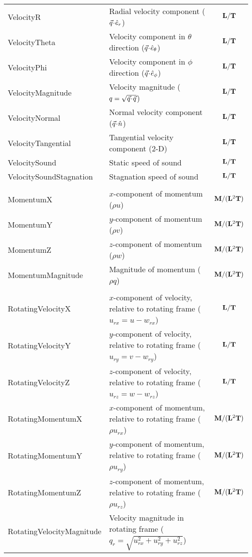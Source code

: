 \begin{longtable}{>{\ttfamily}l >{\raggedright\arraybackslash}p{\Pwidth} c}
VelocityR               & Radial velocity component (${\vec{q}}\!\cdot\!{{\hat{e}}_r}$) &
   ${\bf L}/{\bf T}$ \\
VelocityTheta           & Velocity component in $\theta$ direction (${\vec{q}}\!\cdot\!{{\hat{e}}_\theta}$) &
   ${\bf L}/{\bf T}$ \\
VelocityPhi             & Velocity component in $\phi$ direction (${\vec{q}}\!\cdot\!{{\hat{e}}_\phi}$) &
   ${\bf L}/{\bf T}$ \\
VelocityMagnitude       & Velocity magnitude ($q= \sqrt{ {\vec{q}}\!\cdot\!{\vec{q}} }$) &
   ${\bf L}/{\bf T}$ \\
VelocityNormal          & Normal velocity component (${\vec{q}}\!\cdot\!{\hat{n}}$) &
   ${\bf L}/{\bf T}$ \\
VelocityTangential      & Tangential velocity component (2-D) &
   ${\bf L}/{\bf T}$ \\
VelocitySound           & Static speed of sound &
   ${\bf L}/{\bf T}$ \\      
VelocitySoundStagnation & Stagnation speed of sound &
   ${\bf L}/{\bf T}$ \\
\\
MomentumX               & $x$-component of momentum ($\rho u$) &
   ${\bf M}/({\bf L}^2{\bf T})$ \\
MomentumY               & $y$-component of momentum ($\rho v$) &
   ${\bf M}/({\bf L}^2{\bf T})$ \\
MomentumZ               & $z$-component of momentum ($\rho w$) &
   ${\bf M}/({\bf L}^2{\bf T})$ \\
MomentumMagnitude       & Magnitude of momentum ($\rho q$) &
   ${\bf M}/({\bf L}^2{\bf T})$ \\
\\
RotatingVelocityX       & $x$-component of velocity, relative to rotating frame ($u_{rx} = u - w_{rx}$) &
   ${\bf L}/{\bf T}$ \\
RotatingVelocityY       & $y$-component of velocity, relative to rotating frame ($u_{ry} = v - w_{ry}$) &
   ${\bf L}/{\bf T}$ \\
RotatingVelocityZ       & $z$-component of velocity, relative to rotating frame ($u_{rz} = w - w_{rz}$) &
   ${\bf L}/{\bf T}$ \\
RotatingMomentumX       & $x$-component of momentum, relative to rotating frame ($\rho u_{rx}$) &
   ${\bf M}/({\bf L}^2{\bf T})$ \\
RotatingMomentumY       & $y$-component of momentum, relative to rotating frame ($\rho u_{ry}$) &
   ${\bf M}/({\bf L}^2{\bf T})$ \\
RotatingMomentumZ       & $z$-component of momentum, relative to rotating frame ($\rho u_{rz}$) &
   ${\bf M}/({\bf L}^2{\bf T})$ \\
RotatingVelocityMagnitude & Velocity magnitude in rotating frame ($q_r = \sqrt{ u_{rx}^2 + u_{ry}^2 + u_{rz}^2 }$) &

\end{longtable}
